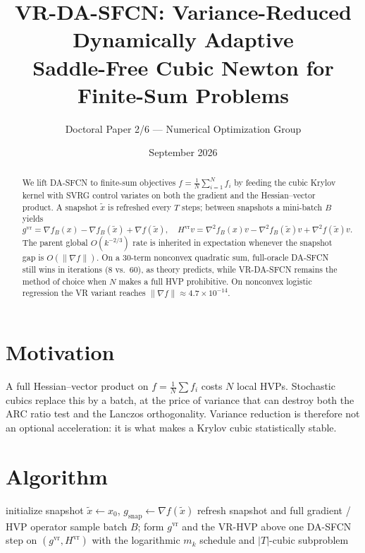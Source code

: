\documentclass[11pt,a4paper]{article}
\title{\textbf{VR-DA-SFCN: Variance-Reduced Dynamically Adaptive\\
Saddle-Free Cubic Newton for Finite-Sum Problems}}
\author{Doctoral Paper 2/6 --- Numerical Optimization Group}
\date{September 2026}
\begin{document}
\maketitle
\begin{abstract}
We lift DA-SFCN to finite-sum objectives $f=\frac1N\sum_{i=1}^N f_i$ by
feeding the cubic Krylov kernel with SVRG control variates on both the
gradient and the Hessian--vector product. A snapshot $\tilde x$ is
refreshed every $T$ steps; between snapshots a mini-batch $B$ yields
\[
g^{\mathrm{vr}}=\nabla f_B(x)-\nabla f_B(\tilde x)+\nabla f(\tilde x),\quad
H^{\mathrm{vr}}v=\nabla^2 f_B(x)v-\nabla^2 f_B(\tilde x)v+\nabla^2 f(\tilde x)v.
\]
The parent global $O(k^{-2/3})$ rate is inherited in expectation whenever
the snapshot gap is $O(\|\nabla f\|)$. On a 30-term nonconvex quadratic
sum, full-oracle DA-SFCN still wins in iterations (8 vs.\ 60), as theory
predicts, while VR-DA-SFCN remains the method of choice when $N$ makes a
full HVP prohibitive. On nonconvex logistic regression the VR variant
reaches $\|\nabla f\|\approx 4.7\times 10^{-14}$.
\end{abstract}

\section{Motivation}
A full Hessian--vector product on $f=\frac1N\sum f_i$ costs $N$ local
HVPs. Stochastic cubics \cite{tripuraneni2018,pasechnyuk2025} replace this
by a batch, at the price of variance that can destroy both the ARC ratio
test and the Lanczos orthogonality. Variance reduction is therefore not
an optional acceleration: it is what makes a Krylov cubic statistically
stable.

\section{Algorithm}
\begin{algorithm}[h]
\caption{VR-DA-SFCN}
\begin{algorithmic}[1]
\State initialize snapshot $\tilde x\gets x_0$, $g_{\mathrm{snap}}\gets\nabla f(\tilde x)$
   refresh snapshot and full gradient / HVP operator
  \EndIf
  \State sample batch $B$; form $g^{\mathrm{vr}}$ and the VR-HVP above
  \State one DA-SFCN step on $(g^{\mathrm{vr}},H^{\mathrm{vr}})$ with the
         logarithmic $m_k$ schedule and $|T|$-cubic subproblem
\EndFor
\end{algorithmic}
\end{algorithm}
\end{document}
